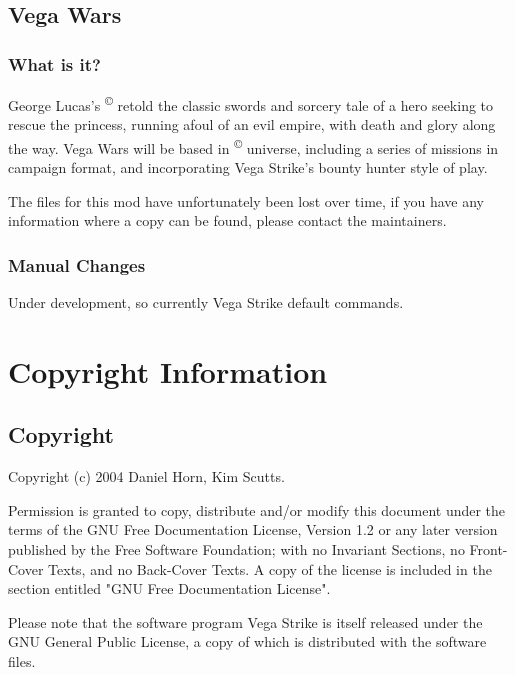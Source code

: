 \documentclass{article}
\begin{document}
\subsection{ Vega Wars }

\subsubsection{ What is it? }

George Lucas's \textsuperscript{\copyright}  retold the classic swords and sorcery tale of a hero seeking to rescue the princess, running afoul of an evil empire, with death and glory along the way. Vega Wars will be based in \textsuperscript{\copyright}  universe, including a series of missions in campaign format, and incorporating Vega Strike's bounty hunter style of play. 

The files for this mod have unfortunately been lost over time, if you have any information where a copy can be found, please contact the maintainers.

\subsubsection{ Manual Changes }

Under development, so currently Vega Strike default commands. 



\section{ Copyright Information }

\subsection{ Copyright }

Copyright (c) 2004 Daniel Horn, Kim Scutts. 

Permission is granted to copy, distribute and/or modify this document under the terms of the GNU Free Documentation License, Version 1.2 or any later version published by the Free Software Foundation; with no Invariant Sections, no Front-Cover Texts, and no Back-Cover Texts. A copy of the license is included in the section entitled "GNU Free Documentation License". 

Please note that the software program Vega Strike is itself released under the GNU General Public License, a copy of which is distributed with the software files. 
\end{document}
